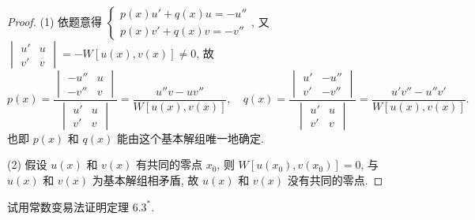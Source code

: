 \begin{proof}
  (1) 依题意得 $\begin{cases}p(x)u'+q(x)u=-u''\\p(x)v'+q(x)v=-v''\end{cases}$, 
  又 $\begin{vmatrix}u'&u\\v'&v\end{vmatrix}=-W[u(x),v(x)]\neq 0$, 故
  \[p(x) 
    = \frac{\begin{vmatrix}-u''&u\\-v''&v\end{vmatrix}}{\begin{vmatrix}u'&u\\v'&v\end{vmatrix}}
    = \frac{u''v-uv''}{W[u(x),v(x)]},\quad
    q(x)
    = \frac{\begin{vmatrix}u'&-u''\\v'&-v''\end{vmatrix}}{\begin{vmatrix}u'&u\\v'&v\end{vmatrix}}
    = \frac{u'v''-u''v'}{W[u(x),v(x)]}.\]
  也即 $p(x)$ 和 $q(x)$ 能由这个基本解组唯一地确定.

  (2) 假设 $u(x)$ 和 $v(x)$ 有共同的零点 $x_0$, 则 $W[u(x_0),v(x_0)]=0$, 
  与 $u(x)$ 和 $v(x)$ 为基本解组相矛盾, 故 $u(x)$ 和 $v(x)$ 没有共同的零点.
\end{proof}



\begin{exercise}
  试用常数变易法证明定理 $6.3^*$.
\end{exercise}


